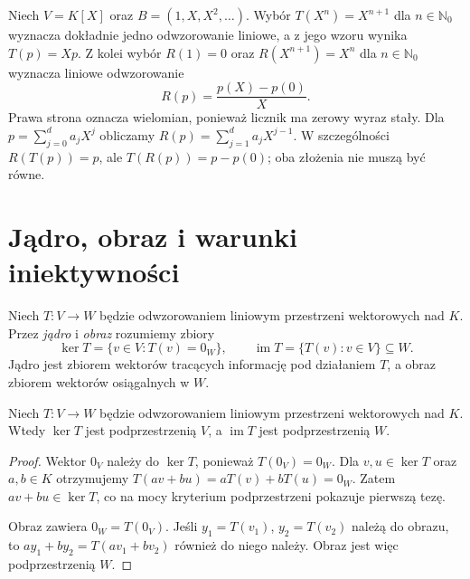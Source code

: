 \begin{przyklad}
\label{prz:lin3-przesuniecia-wielomianow}
Niech \(V=K[X]\) oraz \(B=(1,X,X^2,\ldots)\).
Wybór \(T(X^n)=X^{n+1}\) dla \(n\in\mathbb N_0\)
wyznacza dokładnie jedno odwzorowanie liniowe,
a z jego wzoru wynika \(T(p)=Xp\).
Z kolei wybór \(R(1)=0\) oraz
\(R(X^{n+1})=X^n\) dla \(n\in\mathbb N_0\)
wyznacza liniowe odwzorowanie
\[
 R(p)=\frac{p(X)-p(0)}{X}.
\]
Prawa strona oznacza wielomian, ponieważ
licznik ma zerowy wyraz stały.
Dla \(p=\sum_{j=0}^{d}a_jX^j\)
obliczamy \(R(p)=\sum_{j=1}^{d}a_jX^{j-1}\).
W szczególności \(R(T(p))=p\), ale
\(T(R(p))=p-p(0)\); oba złożenia
nie muszą być równe.
\end{przyklad}

\section{Jądro, obraz i warunki iniektywności}
\label{sec:lin3-jadro-obraz}

\begin{definicja}
\label{def:lin3-jadro-obraz}
Niech \(T\colon V\to W\) będzie odwzorowaniem
liniowym przestrzeni wektorowych nad \(K\).
Przez \emph{jądro} i \emph{obraz} rozumiemy zbiory
\[
 \ker T=\{v\in V:T(v)=0_W\},\qquad
 \operatorname{im}T=\{T(v):v\in V\}\subseteq W.
\]
Jądro jest zbiorem wektorów tracących
informację pod działaniem \(T\),
a obraz zbiorem wektorów osiągalnych w \(W\).
\end{definicja}

\begin{twierdzenie}
\label{thm:lin3-jadro-obraz-podprzestrzenie}
Niech \(T\colon V\to W\) będzie odwzorowaniem
liniowym przestrzeni wektorowych nad \(K\).
Wtedy \(\ker T\) jest podprzestrzenią \(V\),
a \(\operatorname{im}T\) jest podprzestrzenią \(W\).
\end{twierdzenie}
\begin{proof}
Wektor \(0_V\) należy do \(\ker T\),
ponieważ \(T(0_V)=0_W\).
Dla \(v,u\in\ker T\) oraz \(a,b\in K\)
otrzymujemy \(T(av+bu)=aT(v)+bT(u)=0_W\).
Zatem \(av+bu\in\ker T\), co na mocy
kryterium podprzestrzeni pokazuje pierwszą tezę.

Obraz zawiera \(0_W=T(0_V)\).
Jeśli \(y_1=T(v_1)\), \(y_2=T(v_2)\)
należą do obrazu, to
\(ay_1+by_2=T(av_1+bv_2)\)
również do niego należy.
Obraz jest więc podprzestrzenią \(W\).
\end{proof}

